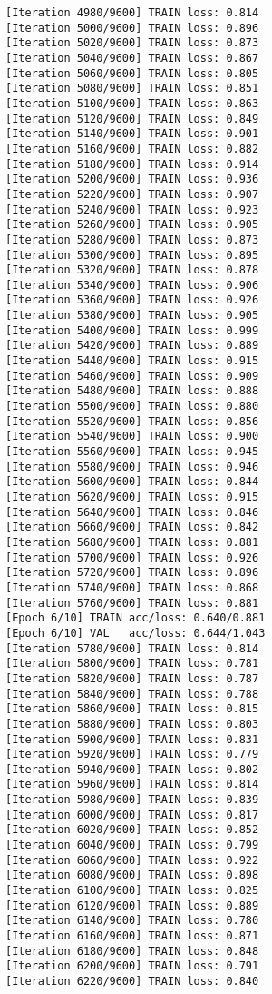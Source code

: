 \documentclass[11pt]{article}
\begin{document}
\begin{Verbatim}[commandchars=\\\{\}]
[Iteration 4980/9600] TRAIN loss: 0.814
[Iteration 5000/9600] TRAIN loss: 0.896
[Iteration 5020/9600] TRAIN loss: 0.873
[Iteration 5040/9600] TRAIN loss: 0.867
[Iteration 5060/9600] TRAIN loss: 0.805
[Iteration 5080/9600] TRAIN loss: 0.851
[Iteration 5100/9600] TRAIN loss: 0.863
[Iteration 5120/9600] TRAIN loss: 0.849
[Iteration 5140/9600] TRAIN loss: 0.901
[Iteration 5160/9600] TRAIN loss: 0.882
[Iteration 5180/9600] TRAIN loss: 0.914
[Iteration 5200/9600] TRAIN loss: 0.936
[Iteration 5220/9600] TRAIN loss: 0.907
[Iteration 5240/9600] TRAIN loss: 0.923
[Iteration 5260/9600] TRAIN loss: 0.905
[Iteration 5280/9600] TRAIN loss: 0.873
[Iteration 5300/9600] TRAIN loss: 0.895
[Iteration 5320/9600] TRAIN loss: 0.878
[Iteration 5340/9600] TRAIN loss: 0.906
[Iteration 5360/9600] TRAIN loss: 0.926
[Iteration 5380/9600] TRAIN loss: 0.905
[Iteration 5400/9600] TRAIN loss: 0.999
[Iteration 5420/9600] TRAIN loss: 0.889
[Iteration 5440/9600] TRAIN loss: 0.915
[Iteration 5460/9600] TRAIN loss: 0.909
[Iteration 5480/9600] TRAIN loss: 0.888
[Iteration 5500/9600] TRAIN loss: 0.880
[Iteration 5520/9600] TRAIN loss: 0.856
[Iteration 5540/9600] TRAIN loss: 0.900
[Iteration 5560/9600] TRAIN loss: 0.945
[Iteration 5580/9600] TRAIN loss: 0.946
[Iteration 5600/9600] TRAIN loss: 0.844
[Iteration 5620/9600] TRAIN loss: 0.915
[Iteration 5640/9600] TRAIN loss: 0.846
[Iteration 5660/9600] TRAIN loss: 0.842
[Iteration 5680/9600] TRAIN loss: 0.881
[Iteration 5700/9600] TRAIN loss: 0.926
[Iteration 5720/9600] TRAIN loss: 0.896
[Iteration 5740/9600] TRAIN loss: 0.868
[Iteration 5760/9600] TRAIN loss: 0.881
[Epoch 6/10] TRAIN acc/loss: 0.640/0.881
[Epoch 6/10] VAL   acc/loss: 0.644/1.043
[Iteration 5780/9600] TRAIN loss: 0.814
[Iteration 5800/9600] TRAIN loss: 0.781
[Iteration 5820/9600] TRAIN loss: 0.787
[Iteration 5840/9600] TRAIN loss: 0.788
[Iteration 5860/9600] TRAIN loss: 0.815
[Iteration 5880/9600] TRAIN loss: 0.803
[Iteration 5900/9600] TRAIN loss: 0.831
[Iteration 5920/9600] TRAIN loss: 0.779
[Iteration 5940/9600] TRAIN loss: 0.802
[Iteration 5960/9600] TRAIN loss: 0.814
[Iteration 5980/9600] TRAIN loss: 0.839
[Iteration 6000/9600] TRAIN loss: 0.817
[Iteration 6020/9600] TRAIN loss: 0.852
[Iteration 6040/9600] TRAIN loss: 0.799
[Iteration 6060/9600] TRAIN loss: 0.922
[Iteration 6080/9600] TRAIN loss: 0.898
[Iteration 6100/9600] TRAIN loss: 0.825
[Iteration 6120/9600] TRAIN loss: 0.889
[Iteration 6140/9600] TRAIN loss: 0.780
[Iteration 6160/9600] TRAIN loss: 0.871
[Iteration 6180/9600] TRAIN loss: 0.848
[Iteration 6200/9600] TRAIN loss: 0.791
[Iteration 6220/9600] TRAIN loss: 0.840

\end{Verbatim}
\end{document}
